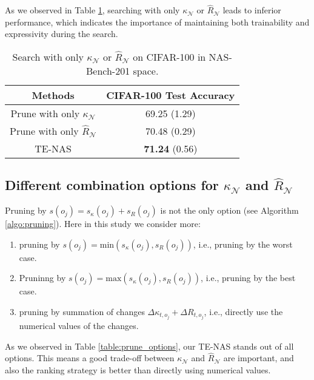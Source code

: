 \documentclass{article} \usepackage{iclr2021_conference,times}
\begin{document}
As we observed in Table \ref{table:search_only_k_R}, searching with only $\kappa_\mathcal{N}$ or $\hat{R}_\mathcal{N}$ leads to inferior performance, which indicates the importance of maintaining both trainability and expressivity during the search.

\begin{table}[h!]
\caption{Search with only $\kappa_\mathcal{N}$ or $\hat{R}_\mathcal{N}$ on CIFAR-100 in NAS-Bench-201 space.}
\centering
\footnotesize
\begin{tabular}{cc}
\toprule
Methods & CIFAR-100 Test Accuracy \\ \midrule
Prune with only $\kappa_\mathcal{N}$ & 69.25 (1.29) \\
Prune with only $\hat{R}_\mathcal{N}$ & 70.48 (0.29) \\
TE-NAS & \textbf{71.24} (0.56) \\ \bottomrule
\end{tabular}
\label{table:search_only_k_R}
\end{table}


\subsection{Different combination options for $\kappa_\mathcal{N}$ and $\hat{R}_\mathcal{N}$}\label{sec:appendix_prune_option}

Pruning by $s(o_j) = s_\kappa(o_j) + s_R(o_j)$ is not the only option (see Algorithm \ref{algo:pruning}). Here in this study we consider more:
\begin{enumerate}
    \item[1)] pruning by $s(o_j) = \mathrm{min}(s_\kappa(o_j), s_R(o_j))$, i.e., pruning by the worst case.
    \item[2)] Pruninng by $s(o_j) = \mathrm{max}(s_\kappa(o_j), s_R(o_j))$, i.e., pruning by the best case.
    \item[3)] pruning by summation of changes $\Delta \kappa_{t, o_j} + \Delta R_{t, o_j}$, i.e., directly use the numerical values of the changes.
\end{enumerate}

As we observed in Table \ref{table:prune_options}, our TE-NAS stands out of all options. This means a good trade-off between $\kappa_\mathcal{N}$ and $\hat{R}_\mathcal{N}$ are important, and also the ranking strategy is better than directly using numerical values.
\end{document}
